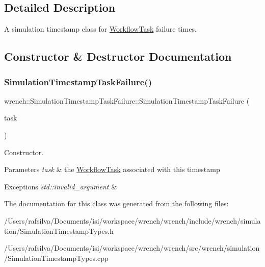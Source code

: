 \subsection{Detailed Description}
A simulation timestamp class for \hyperlink{classwrench_1_1_workflow_task}{Workflow\+Task} failure times. 

\subsection{Constructor \& Destructor Documentation}
\mbox{\label{classwrench_1_1_simulation_timestamp_task_failure_a466d3e4bd70cee3c5a943e4005545d0d}} 
\subsubsection{\texorpdfstring{Simulation\+Timestamp\+Task\+Failure()}{SimulationTimestampTaskFailure()}}
{\footnotesize\ttfamily wrench\+::\+Simulation\+Timestamp\+Task\+Failure\+::\+Simulation\+Timestamp\+Task\+Failure (\begin{DoxyParamCaption}\item[{\hyperlink{classwrench_1_1_workflow_task}{Workflow\+Task} $\ast$}]{task }\end{DoxyParamCaption})}



Constructor. 


\begin{DoxyParams}{Parameters}
{\em task} & the \hyperlink{classwrench_1_1_workflow_task}{Workflow\+Task} associated with this timestamp \\
\hline
\end{DoxyParams}

\begin{DoxyExceptions}{Exceptions}
{\em std\+::invalid\+\_\+argument} & \\
\hline
\end{DoxyExceptions}


The documentation for this class was generated from the following files\+:\begin{DoxyCompactItemize}
\item 
/\+Users/rafsilva/\+Documents/isi/workspace/wrench/wrench/include/wrench/simulation/Simulation\+Timestamp\+Types.\+h\item 
/\+Users/rafsilva/\+Documents/isi/workspace/wrench/wrench/src/wrench/simulation/Simulation\+Timestamp\+Types.\+cpp\end{DoxyCompactItemize}
